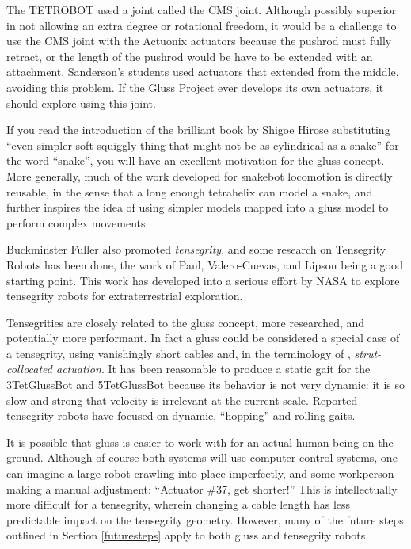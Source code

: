 \documentclass[11pt]{article}
\begin{document}
The TETROBOT used a joint called the CMS joint. Although
possibly superior in not allowing an extra degree or rotational freedom, it would be a challenge to use the CMS
joint with the Actuonix actuators because the pushrod must fully retract, or the length of the pushrod would be
have to be extended with an attachment. Sanderson's students used actuators that
extended from the middle, avoiding this problem. If the Gluss Project ever develops its own actuators, it should
explore using this joint.

If you read the introduction of the brilliant book by Shigoe Hirose\cite{hirose1993biologically} substituting
``even simpler soft squiggly thing that might not be as cylindrical as a snake'' for the word ``snake'', you will have
an excellent motivation for the gluss concept.  More generally, much of the work developed for snakebot
locomotion\cite{liljebäck2012snake} is directly reusable, in the sense that a long enough tetrahelix can
model a snake, and further inspires the idea of using simpler models mapped into a gluss model to perform
complex movements.

Buckminster Fuller also promoted \emph{tensegrity}, and some research on Tensegrity Robots has been done, the
work of Paul, Valero-Cuevas, and Lipson\cite{paul2006} being a good starting point.
This work has developed into a serious effort\cite{NTRT} by NASA to explore tensegrity robots for extraterrestrial
exploration.

Tensegrities are closely related to the gluss concept, more researched, and potentially more performant.
In fact a gluss could be considered a special case of a tensegrity, using vanishingly short cables
and, in the terminology of \cite{paul2006}, \emph{strut-collocated actuation}.
It has been reasonable to produce a static gait for the 3TetGlussBot and 5TetGlussBot because its behavior is not
very dynamic: it is so slow and strong that velocity is irrelevant at the current scale.
Reported tensegrity robots have focused on dynamic, ``hopping'' and rolling gaits.

It is possible that gluss is easier to work with for an actual human being on the ground.
Although of course both systems will use computer control systems, one can imagine a large robot
crawling into place imperfectly, and some workperson making a manual adjustment: ``Actuator \#37, get shorter!''
This is intellectually more difficult for a tensegrity, wherein changing a cable length
has less predictable impact on the tensegrity geometry.
However, many
of the future steps outlined in Section \ref{futuresteps} apply to both gluss and tensegrity robots.
\end{document}

